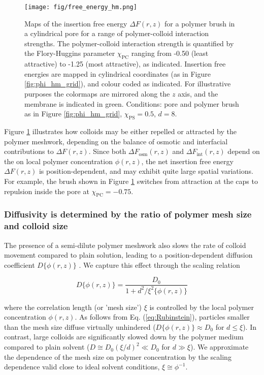 \documentclass[12pt, a4paper]{article}
\begin{document}
\begin{figure}
    \centering
    \texttt{[image: fig/free\_energy\_hm.png]}
    \caption{
    Maps of the insertion free energy $\Delta F(r,z)$ for a polymer brush in a cylindrical pore for a range of polymer-colloid interaction strengths. 
    The polymer-colloid interaction strength is quantified by the Flory-Huggins parameter $\chi_{\text{PC}}$ ranging from -0.50 (least attractive) to -1.25 (most attractive), as indicated. 
    Insertion free energies are mapped in cylindrical coordinates (as in Figure \ref{fig:phi_hm_grid}), and colour coded as indicated. 
    For illustrative purposes the colormaps are mirrored along the $z$ axis, and the membrane is indicated in green. 
    Conditions: pore and polymer brush as in Figure \ref{fig:phi_hm_grid}, $\chi_{\text{PS}}=0.5$, $d=8$.
    }
    \label{fig:DeltaF_map}
\end{figure}

Figure \ref{fig:DeltaF_map} illustrates how colloids may be either repelled or attracted by the polymer meshwork, 
depending on the balance of osmotic and interfacial contributions to $\Delta F(r,z)$. 
Since both $\Delta F_{\text{osm}}(r,z)$ and $\Delta F_{\text{int}}(r,z)$ depend on the on local polymer concentration $\phi(r,z)$, 
the net insertion free energy $\Delta F(r,z)$ is position-dependent, and may exhibit quite large spatial variations. 
For example, the brush shown in Figure \ref{fig:DeltaF_map} switches from attraction at the caps to repulsion inside the pore at $\chi_{\text{PC}}=-0.75$.


\subsubsection{Diffusivity is determined by the ratio of polymer mesh size and colloid size}

The presence of a semi-dilute polymer meshwork also slows the rate of colloid movement compared to plain solution, leading to a position-dependent diffusion coefficient $D\{\phi(r,z)\}$ \cite{Laktionov2023}. 
We capture this effect through the scaling relation

\begin{equation}
    D\{\phi(r,z)\} = \frac{D_0}{1+d^2/\xi^{2}\{\phi(r,z)\}}
    \label{eq:Rubinstein}
\end{equation}

\noindent where the correlation length (or 'mesh size') $\xi$ is controlled by the local polymer concentration $\phi(r,z)$. 
As follows from Eq. (\ref{eq:Rubinstein}), particles smaller than the mesh size diffuse virtually unhindered ($D\{\phi(r,z)\}\approx D_0$ for $d\leq \xi$). 
In contrast, large colloids are significantly slowed down by the polymer medium compared to plain solvent ($D\cong D_0 (\xi/d)^2\ll D_0$ for $d\gg \xi$). 
We approximate the dependence of the mesh size on polymer concentration by the scaling dependence valid close to ideal solvent conditions, $\xi\cong \phi^{-1}$. 
\end{document}
